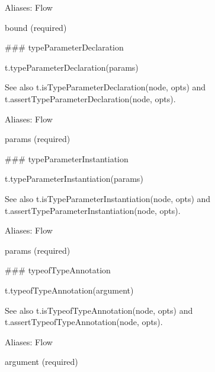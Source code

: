 Aliases\+: {\ttfamily Flow}


\begin{DoxyItemize}
\item {\ttfamily bound} (required) 


\end{DoxyItemize}

\#\#\# type\+Parameter\+Declaration 
\begin{DoxyCode}
t.typeParameterDeclaration(params)
\end{DoxyCode}


See also {\ttfamily t.\+is\+Type\+Parameter\+Declaration(node, opts)} and {\ttfamily t.\+assert\+Type\+Parameter\+Declaration(node, opts)}.

Aliases\+: {\ttfamily Flow}


\begin{DoxyItemize}
\item {\ttfamily params} (required) 


\end{DoxyItemize}

\#\#\# type\+Parameter\+Instantiation 
\begin{DoxyCode}
t.typeParameterInstantiation(params)
\end{DoxyCode}


See also {\ttfamily t.\+is\+Type\+Parameter\+Instantiation(node, opts)} and {\ttfamily t.\+assert\+Type\+Parameter\+Instantiation(node, opts)}.

Aliases\+: {\ttfamily Flow}


\begin{DoxyItemize}
\item {\ttfamily params} (required) 


\end{DoxyItemize}

\#\#\# typeof\+Type\+Annotation 
\begin{DoxyCode}
t.typeofTypeAnnotation(argument)
\end{DoxyCode}


See also {\ttfamily t.\+is\+Typeof\+Type\+Annotation(node, opts)} and {\ttfamily t.\+assert\+Typeof\+Type\+Annotation(node, opts)}.

Aliases\+: {\ttfamily Flow}


\begin{DoxyItemize}
\item {\ttfamily argument} (required) 


\end{DoxyItemize}

